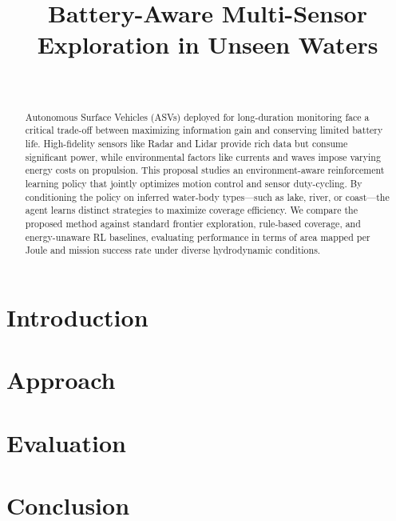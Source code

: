\documentclass[conference]{IEEEtran}
\title{Battery-Aware Multi-Sensor Exploration in Unseen Waters}
\author{\IEEEauthorblockN{IMSEL Research Group} \\
\IEEEauthorblockA{CSCE 775: Deep Reinforcement Learning}}
\begin{document}
\maketitle

\begin{abstract}
Autonomous Surface Vehicles (ASVs) deployed for long-duration monitoring face a critical trade-off between maximizing information gain and conserving limited battery life. High-fidelity sensors like Radar and Lidar provide rich data but consume significant power, while environmental factors like currents and waves impose varying energy costs on propulsion. This proposal studies an environment-aware reinforcement learning policy that jointly optimizes motion control and sensor duty-cycling. By conditioning the policy on inferred water-body types—such as lake, river, or coast—the agent learns distinct strategies to maximize coverage efficiency. We compare the proposed method against standard frontier exploration, rule-based coverage, and energy-unaware RL baselines, evaluating performance in terms of area mapped per Joule and mission success rate under diverse hydrodynamic conditions.
\end{abstract}


\section{Introduction}


\section{Approach}



\section{Evaluation}


\section{Conclusion}




\end{document}
